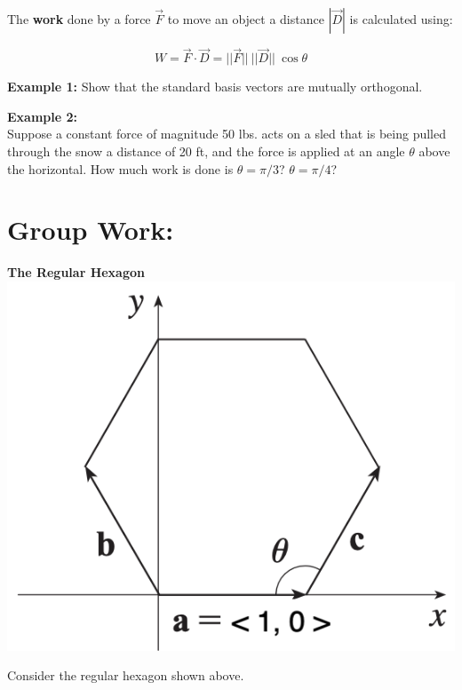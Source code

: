 \hspace*{.2in}

The \textbf{work} done by a force \(\vec{F}\) to move an object a distance \(|\vec{D}|\) is calculated using:

\[W = \vec{F}\cdot \vec{D} = ||\vec{F}||\ ||\vec{D}||\ \cos \theta\]

\vspace*{.5in}




\textbf{Example 1:}
Show that the standard basis vectors are mutually orthogonal.

\vfill

\textbf{Example 2:}\\
Suppose a constant force of magnitude 50 lbs. acts on a sled that is being pulled through the snow a distance of 20 ft, and the force is applied at an angle \(\theta\) above the horizontal. How much work is done is \(\theta = \pi/3\)? \(\theta = \pi/4\)?

\vfill

\pagebreak

\section*{Group Work:}

\begin{center}
\textbf{\Large The Regular Hexagon}\\
\includegraphics[width=.3\textwidth]{Ch2s3-hexagon2.png}
\end{center}
Consider the regular hexagon shown above.

